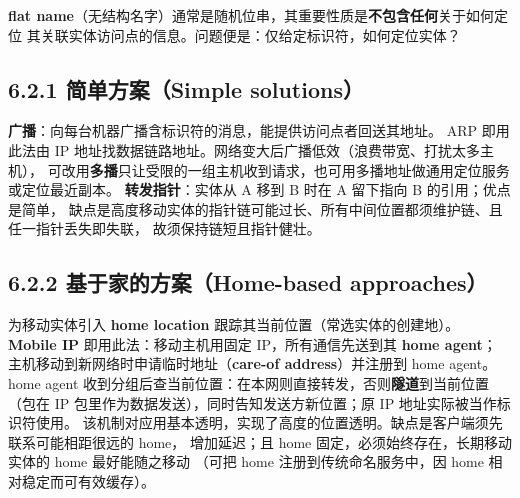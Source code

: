 \begin{closeread}
\end{closeread}



\textbf{flat name}（无结构名字）通常是随机位串，其重要性质是\textbf{不包含任何}关于如何定位
其关联实体访问点的信息。问题便是：仅给定标识符，如何定位实体？

\subsection*{6.2.1 简单方案（Simple solutions）}
\textbf{广播}：向每台机器广播含标识符的消息，能提供访问点者回送其地址。
ARP 即用此法由 IP 地址找数据链路地址。网络变大后广播低效（浪费带宽、打扰太多主机），
可改用\textbf{多播}只让受限的一组主机收到请求，也可用多播地址做通用定位服务或定位最近副本。
\textbf{转发指针}：实体从 A 移到 B 时在 A 留下指向 B 的引用；优点是简单，
缺点是高度移动实体的指针链可能过长、所有中间位置都须维护链、且任一指针丢失即失联，
故须保持链短且指针健壮。

\subsection*{6.2.2 基于家的方案（Home-based approaches）}
为移动实体引入 \textbf{home location} 跟踪其当前位置（常选实体的创建地）。
\textbf{Mobile IP} 即用此法：移动主机用固定 IP，所有通信先送到其 \textbf{home agent}；
主机移动到新网络时申请临时地址（\textbf{care-of address}）并注册到 home agent。
home agent 收到分组后查当前位置：在本网则直接转发，否则\textbf{隧道}到当前位置
（包在 IP 包里作为数据发送），同时告知发送方新位置；原 IP 地址实际被当作标识符使用。
该机制对应用基本透明，实现了高度的位置透明。缺点是客户端须先联系可能相距很远的 home，
增加延迟；且 home 固定，必须始终存在，长期移动实体的 home 最好能随之移动
（可把 home 注册到传统命名服务中，因 home 相对稳定而可有效缓存）。

